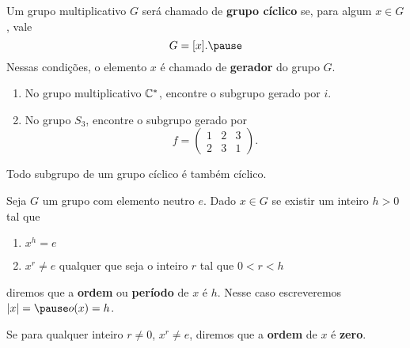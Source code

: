 \documentclass{beamer}
\begin{document}
    \begin{frame}
        \begin{definicao}
            Um grupo multiplicativo $G$ \pause será chamado de \textbf{grupo cíclico} \pause se, para algum $x \in G$, \pause vale \pause
            \[
                G = [x]. \pause
            \]
            Nessas condições, o elemento $x$  \pause é chamado de \textbf{gerador} do grupo $G$.\pause
        \end{definicao}
    \end{frame}

    \begin{frame}
        \begin{exemplos}
            \begin{enumerate}[label={\arabic*})]
                \item No grupo multiplicativo $\mathbb{C}^*$, \pause encontre o subgrupo gerado por $i$.\pause

                \item No grupo $S_3$, \pause encontre o subgrupo gerado por
                \[
                    f = \begin{pmatrix}
                        1 & 2 & 3\\
                        2 & 3 & 1
                    \end{pmatrix}.
                \]
            \end{enumerate}
        \end{exemplos}
    \end{frame}

    \begin{frame}
        \begin{proposicao}
            Todo subgrupo de um grupo cíclico é também cíclico.
        \end{proposicao}
    \end{frame}

    \begin{frame}
        \begin{definicao}
            Seja $G$ um grupo com elemento neutro $e$. \pause Dado $x \in G$ \pause se existir um inteiro $h > 0$ \pause tal que \pause
            \begin{enumerate}[label={\arabic*})]
                \item $x^h = e$ \pause
                \item $x^r \ne e$ \pause qualquer que seja o inteiro $r$ \pause tal que $0 < r < h$\pause
            \end{enumerate}
            diremos que a \textbf{ordem} \pause ou \textbf{período} \pause de $x$ é $h$. \pause Nesse caso escreveremos $|x| = \pause o(x) = h$. \pause

            Se para qualquer inteiro \pause $r \ne 0$, \pause $x^r \ne e$, \pause diremos que a \textbf{ordem} de $x$ é \textbf{zero}.
        \end{definicao}
    \end{frame}
\end{document}
